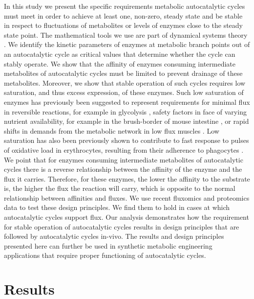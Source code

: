     In this study we present the specific requirements metabolic autocatalytic cycles must meet in order to achieve at least one, non-zero, steady state and be stable in respect to fluctuations of metabolites or levels of enzymes close to the steady state point.
    The mathematical tools we use are part of dynamical systems theory \cite{Strogatz2014-hp}.
    We identify the kinetic parameters of enzymes at metabolic branch points out of an autocatalytic cycle as critical values that determine whether the cycle can stably operate.
    We show that the affinity of enzymes consuming intermediate metabolites of autocatalytic cycles must be limited to prevent drainage of these metabolites.
    Moreover, we show that stable operation of such cycles requires low saturation, and thus excess expression, of these enzymes.
    Such low saturation of enzymes has previously been suggested to represent requirements for minimal flux in reversible reactions, for example in glycolysis \cite{Staples1997-fq,Eanes2006-gh,Flamholz2013-bb}, safety factors in face of varying nutrient availability, for example in the brush-border of mouse intestine \cite{Weiss1998-gp}, or rapid shifts in demands from the metabolic network in low flux muscles \cite{Suarez1997-jo}.
    Low saturation has also been previously shown to contribute to fast response to pulses of oxidative load in erythrocytes, resulting from their adherence to phagocytes \cite{Salvador2003-fc}.
    We point that for enzymes consuming intermediate metabolites of autocatalytic cycles there is a reverse relationship between the affinity of the enzyme and the flux it carries.
    Therefore, for these enzymes, the lower the affinity to the substrate is, the higher the flux the reaction will carry, which is opposite to the normal relationship between affinities and fluxes.
    We use recent fluxomics and proteomics data to test these design principles.
    We find them to hold in cases at which autocatalytic cycles support flux.
    Our analysis demonstrates how the requirement for stable operation of autocatalytic cycles results in design principles that are followed by autocatalytic cycles in-vivo.
    The results and design principles presented here can further be used in synthetic metabolic engineering applications that require proper functioning of autocatalytic cycles.

\section{Results}
